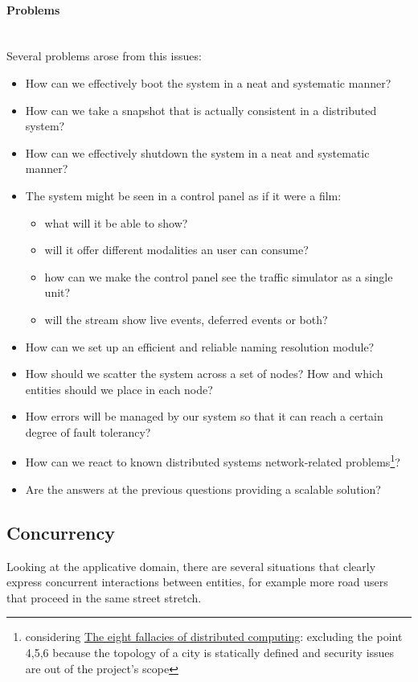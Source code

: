 \paragraph{Problems} \mbox{} \\

Several problems arose from this issues:

\begin{itemize}
\item How can we effectively boot the system in a neat and systematic manner?
\item How can we take a snapshot that is actually consistent in a distributed
  system?
\item How can we effectively shutdown the system in a neat and systematic
  manner?
\item The system might be seen in a control panel as if it were a film:
  \begin{itemize}
  \item what will it be able to show?
  \item will it offer different modalities an user can consume?
  \item how can we make the control panel see the traffic simulator as a
    single unit?
  \item will the stream show live events, deferred events or both?
  \end{itemize}
\item How can we set up an efficient and reliable naming resolution module?
\item How should we scatter the system across a set of nodes? How and which
  entities should we place in each node?
\item How errors will be managed by our system so that it can reach a certain
  degree of fault tolerancy?
\item How can we react to known distributed systems network-related 
problems\footnote{considering \href{https://blogs.oracle.com/jag/resource/Fallacies.html?cm_mc_uid=82650292107114582847614&cm_mc_sid_50200000=1458564821}{The eight fallacies of distributed computing}: excluding the point 4,5,6 because the topology of a city is statically defined and security issues are out of the project's scope}?
\item Are the answers at the previous questions providing a scalable solution?
\end{itemize}

\subsection{Concurrency}
Looking at the applicative domain, there are several situations that clearly
express concurrent interactions between entities, for example more road users
that proceed in the same street stretch.

